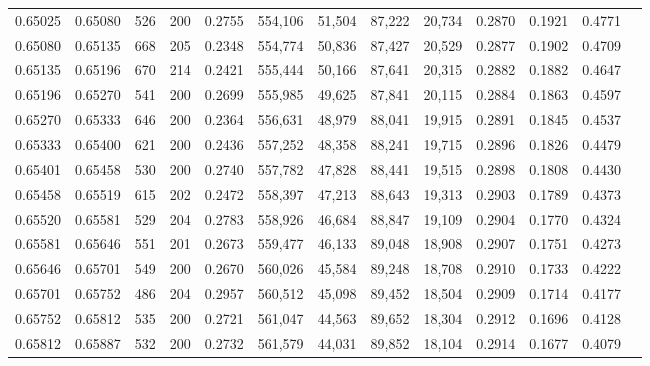 \begin{tabular}{rrrrrrrrrrrrr}
0.65025 & 0.65080 &   526 & 200 &                                     0.2755 & 554,106 &  51,504 &  87,222 &  20,734 & 0.2870 & 0.1921 & 0.4771 \\
0.65080 & 0.65135 &   668 & 205 &                                     0.2348 & 554,774 &  50,836 &  87,427 &  20,529 & 0.2877 & 0.1902 & 0.4709 \\
0.65135 & 0.65196 &   670 & 214 &                                     0.2421 & 555,444 &  50,166 &  87,641 &  20,315 & 0.2882 & 0.1882 & 0.4647 \\
0.65196 & 0.65270 &   541 & 200 &                                     0.2699 & 555,985 &  49,625 &  87,841 &  20,115 & 0.2884 & 0.1863 & 0.4597 \\
0.65270 & 0.65333 &   646 & 200 &                                     0.2364 & 556,631 &  48,979 &  88,041 &  19,915 & 0.2891 & 0.1845 & 0.4537 \\
0.65333 & 0.65400 &   621 & 200 &                                     0.2436 & 557,252 &  48,358 &  88,241 &  19,715 & 0.2896 & 0.1826 & 0.4479 \\
0.65401 & 0.65458 &   530 & 200 &                                     0.2740 & 557,782 &  47,828 &  88,441 &  19,515 & 0.2898 & 0.1808 & 0.4430 \\
0.65458 & 0.65519 &   615 & 202 &                                     0.2472 & 558,397 &  47,213 &  88,643 &  19,313 & 0.2903 & 0.1789 & 0.4373 \\
0.65520 & 0.65581 &   529 & 204 &                                     0.2783 & 558,926 &  46,684 &  88,847 &  19,109 & 0.2904 & 0.1770 & 0.4324 \\
0.65581 & 0.65646 &   551 & 201 &                                     0.2673 & 559,477 &  46,133 &  89,048 &  18,908 & 0.2907 & 0.1751 & 0.4273 \\
0.65646 & 0.65701 &   549 & 200 &                                     0.2670 & 560,026 &  45,584 &  89,248 &  18,708 & 0.2910 & 0.1733 & 0.4222 \\
0.65701 & 0.65752 &   486 & 204 &                                     0.2957 & 560,512 &  45,098 &  89,452 &  18,504 & 0.2909 & 0.1714 & 0.4177 \\
0.65752 & 0.65812 &   535 & 200 &                                     0.2721 & 561,047 &  44,563 &  89,652 &  18,304 & 0.2912 & 0.1696 & 0.4128 \\
0.65812 & 0.65887 &   532 & 200 &                                     0.2732 & 561,579 &  44,031 &  89,852 &  18,104 & 0.2914 & 0.1677 & 0.4079 \\

\end{tabular}
